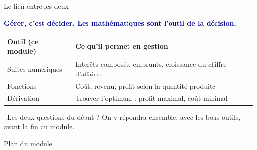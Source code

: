 \documentclass[aspectratio=169,11pt]{beamer}
\newcommand{\key}[1]{\textcolor{DarkBlue}{\textbf{#1}}}
\begin{document}
	\begin{frame}{Le lien entre les deux}
		
		\begin{definitionbox}
			\centering
			\key{Gérer, c'est décider. Les mathématiques sont l'outil de la décision.}
		\end{definitionbox}
		
		\pause
		\begin{table}
			\centering
			\small
			\renewcommand{\arraystretch}{1.3}
			\begin{tabular}{p{3cm}p{7cm}}
				\toprule
				\textbf{Outil (ce module)} & \textbf{Ce qu'il permet en gestion} \\
				\midrule
				Suites numériques & Intérêts composés, emprunts, croissance du chiffre d'affaires \\
				Fonctions & Coût, revenu, profit selon la quantité produite \\
				Dérivation & Trouver l'optimum : profit maximal, coût minimal \\
				\bottomrule
			\end{tabular}
		\end{table}
		
		\pause
		\begin{applicationbox}
			\centering
			\faLightbulb\ Les deux questions du début ? On y répondra ensemble, avec les bons outils, avant la fin du module.
		\end{applicationbox}
		
	\end{frame}
	\begin{frame}{Plan du module}
		\tableofcontents 
	\end{frame}
	
	
\end{document}

